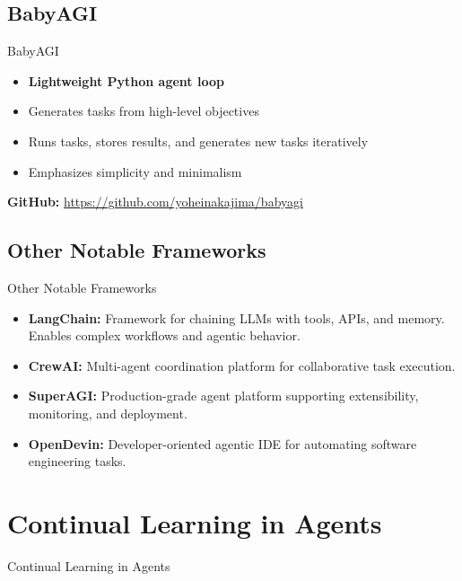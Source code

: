 \subsection{BabyAGI}
\begin{frame}[allowframebreaks]{BabyAGI}
    \begin{itemize}
        \setlength{\itemsep}{1em}
        \item \textbf{Lightweight Python agent loop}
        \item Generates tasks from high-level objectives
        \item Runs tasks, stores results, and generates new tasks iteratively
        \item Emphasizes simplicity and minimalism
    \end{itemize}
    \vspace{0.5em}
    \textbf{GitHub:} \href{https://github.com/yoheinakajima/babyagi}{https://github.com/yoheinakajima/babyagi}
\end{frame}


\subsection{Other Notable Frameworks}
\begin{frame}[allowframebreaks]{Other Notable Frameworks}
    \begin{itemize}
        \setlength{\itemsep}{1em}
        \item \textbf{LangChain:} Framework for chaining LLMs with tools, APIs, and memory. Enables complex workflows and agentic behavior.
        \item \textbf{CrewAI:} Multi-agent coordination platform for collaborative task execution.
        \item \textbf{SuperAGI:} Production-grade agent platform supporting extensibility, monitoring, and deployment.
        \item \textbf{OpenDevin:} Developer-oriented agentic IDE for automating software engineering tasks.
    \end{itemize}
\end{frame}


\section{Continual Learning in Agents}
\begin{frame}{}
    \LARGE Continual Learning in Agents
\end{frame}



